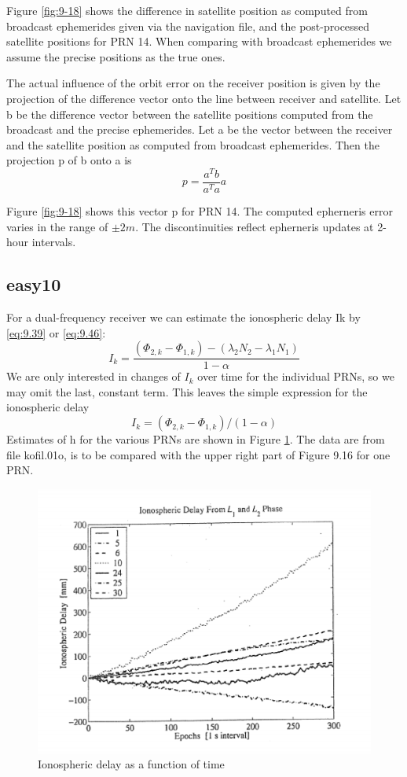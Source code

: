 		Figure \ref{fig:9-18} shows the difference in satellite position as computed from broadcast ephemerides given via the navigation file, and the post-processed satellite positions for PRN 14. When comparing with broadcast ephemerides we assume the precise positions as the true ones.
		
		The actual influence of the orbit error on the receiver position is given by the projection of the difference vector onto the line between receiver and satellite. Let b be the difference vector between the satellite positions computed from the broadcast and the precise ephemerides. Let a be the vector between the receiver and the satellite position as computed from broadcast ephemerides. Then the projection p of b onto a is
		\begin{equation*}
			p=\dfrac{a^Tb}{a^Ta}a
		\end{equation*}
		
		Figure \ref{fig:9-18} shows this vector p for PRN 14. The computed epherneris error varies in the range of $\pm2m$. The discontinuities reflect epherneris updates at 2-hour intervals.
		
	\subsection{easy10}\label{subsec:easy10}
		For a dual-frequency receiver we can estimate the ionospheric delay Ik by \ref{eq:9.39} or \ref{eq:9.46}:
		\begin{equation*}
		I_k=\dfrac{(\Phi_{2,k}-\Phi_{1,k})-(\lambda_2N_2-\lambda_1N_1)}{1-\alpha}
		\end{equation*}
		We are only interested in changes of $I_k$ over time for the individual PRNs, so we may omit the last, constant term. This leaves the simple expression for the ionospheric delay
		\begin{equation*}
		I_k=(\Phi_{2,k}-\Phi_{1,k})/(1-\alpha)
		\end{equation*}
		Estimates of h for the various PRNs are shown in Figure \ref{fig:9-19}. The data are from file kofil.01o, is to be compared with the upper right part of Figure 9.16 for one PRN.
		\begin{figure}
			\centering
			\includegraphics[width=0.7\linewidth]{TeX_files/Part03/chapter09/image/9-19}
			\caption{Ionospheric delay as a function of time}
			\label{fig:9-19}
		\end{figure}
	
